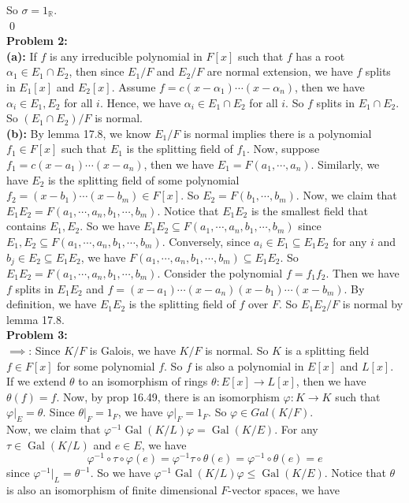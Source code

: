 \documentclass[12pt]{amsart}
\newcommand{\R}{\mathbb{R}}
\newcommand{\Gal}[0]{\operatorname{Gal}}
\begin{document}
So $\sigma=1_\R$.
\\\qed\\
\textbf{Problem 2:}
\\\textbf{(a):} If $f$ is any irreducible polynomial in $F[x]$ such that $f$ has a root $\alpha_1\in E_1\cap E_2$, then since $E_1/F$ and $E_2/F$ are normal extension, we have $f$ splits in $E_1[x]$ and $E_2[x]$. Assume $f=c(x-\alpha_1)\cdots(x-\alpha_n)$, then we have $\alpha_i\in E_1,E_2$ for all $i$. Hence, we have $\alpha_i\in E_1\cap E_2$ for all $i$. So $f$ splits in $E_1\cap E_2$. So $(E_1\cap E_2)/F$ is normal.\\
\textbf{(b):} By lemma 17.8, we know $E_1/F$ is normal implies there is a polynomial $f_1\in F[x]$ such that $E_1$ is the splitting field of $f_1$. Now, suppose $f_1=c(x-a_1)\cdots (x-a_n)$, then we have $E_1=F(a_1,\cdots,a_n)$. Similarly, we have $E_2$ is the splitting field of some polynomial $f_2=(x-b_1)\cdots(x-b_m)\in F[x]$. So $E_2=F(b_1,\cdots,b_m)$. Now, we claim that $E_1E_2=F(a_1,\cdots,a_n,b_1,\cdots, b_m)$. Notice that $E_1E_2$ is the smallest field that contains $E_1,E_2$. So we have $E_1E_2\subseteq F(a_1,\cdots,a_n,b_1,\cdots, b_m)$ since $E_1,E_2\subseteq F(a_1,\cdots,a_n,b_1,\cdots, b_m)$. Conversely, since $a_i\in E_1\subseteq E_1E_2$ for any $i$ and $b_j\in E_2\subseteq E_1E_2$, we have $F(a_1,\cdots,a_n,b_1,\cdots, b_m)\subseteq E_1E_2$. So $E_1E_2=F(a_1,\cdots,a_n,b_1,\cdots, b_m)$. Consider the polynomial $f=f_1f_2$. Then we have $f$ splits in $E_1E_2$ and $f=(x-a_1)\cdots (x-a_n)(x-b_1)\cdots (x-b_m)$. By definition, we have $E_1E_2$ is the splitting field of $f$ over $F$. So $E_1E_2/F$ is normal by lemma 17.8.\\
\textbf{Problem 3:}\\
$\implies$: Since $K/F$ is Galois, we have $K/F$ is normal. So $K$ is a splitting field $f\in F[x]$ for some polynomial $f$. So $f$ is also a polynomial in $E[x]$ and $L[x]$. If we extend $\theta$ to an isomorphism of rings $\theta:E[x]\to L[x]$, then we have $\theta(f)=f$. Now, by prop 16.49, there is an isomorphism $\varphi:K\to K$ such that $\varphi|_E=\theta$. Since $\theta|_F=1_F$, we have $\varphi|_F=1_F$. So $\varphi\in Gal(K/F)$.\\
Now, we claim that $\varphi^{-1}\Gal(K/L)\varphi=\Gal(K/E)$. For any $\tau\in \Gal(K/L)$ and $e\in E$, we have 
\[\varphi^{-1}\circ \tau\circ \varphi(e)=\varphi^{-1}\tau\circ \theta(e)=\varphi^{-1}\circ \theta(e)=e\]
since $\varphi^{-1}|_L=\theta^{-1}$. So we have $\varphi^{-1}\Gal(K/L)\varphi\leq \Gal(K/E)$. Notice that $\theta$ is also an isomorphism of finite dimensional $F$-vector spaces, we have 
\end{document}
